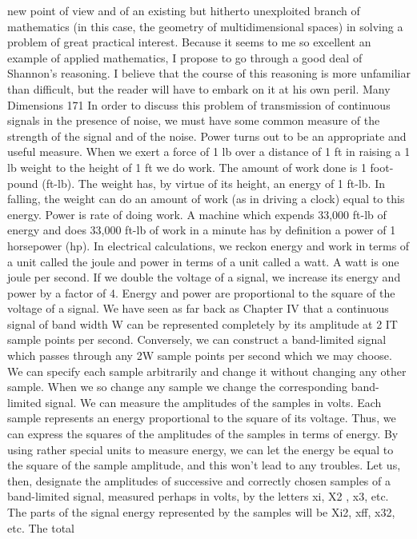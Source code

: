 {{{{{{{{{{new point of view and of an existing but hitherto unexploited
branch of mathematics (in this case, the geometry of multidimensional
spaces) in solving a problem of great practical interest.
Because it seems to me so excellent an example of applied mathematics,
I propose to go through a good deal of Shannon’s reasoning.
I believe that the course of this reasoning is more unfamiliar
than difficult, but the reader will have to embark on it at his
own peril.
Many Dimensions
171
In order to discuss this problem of transmission of continuous
signals in the presence of noise, we must have some common
measure of the strength of the signal and of the noise. Power turns
out to be an appropriate and useful measure.
When we exert a force of 1 lb over a distance of 1 ft in raising
a 1 lb weight to the height of 1 ft we do work. The amount of work
done is 1 foot-pound (ft-lb). The weight has, by virtue of its height,
an energy of 1 ft-lb. In falling, the weight can do an amount of
work (as in driving a clock) equal to this energy.
Power is rate of doing work. A machine which expends 33,000
ft-lb of energy and does 33,000 ft-lb of work in a minute has by
definition a power of 1 horsepower (hp).
In electrical calculations, we reckon energy and work in terms
of a unit called the joule and power in terms of a unit called a watt.
A watt is one joule per second.
If we double the voltage of a signal, we increase its energy and
power by a factor of 4. Energy and power are proportional to the
square of the voltage of a signal.
We have seen as far back as Chapter IV that a continuous
signal of band width W can be represented completely by its
amplitude at 2 IT sample points per second. Conversely, we can
construct a band-limited signal which passes through any 2W
sample points per second which we may choose. We can specify
each sample arbitrarily and change it without changing any other
sample. When we so change any sample we change the corresponding
band-limited signal.
We can measure the amplitudes of the samples in volts. Each
sample represents an energy proportional to the square of its
voltage.
Thus, we can express the squares of the amplitudes of the
samples in terms of energy. By using rather special units to measure
energy, we can let the energy be equal to the square of the sample
amplitude, and this won’t lead to any troubles.
Let us, then, designate the amplitudes of successive and correctly
chosen samples of a band-limited signal, measured perhaps
in volts, by the letters xi, X2 , x3, etc. The parts of the signal energy
represented by the samples will be Xi2, xff, x32, etc. The total
}}}}}}}}}}
